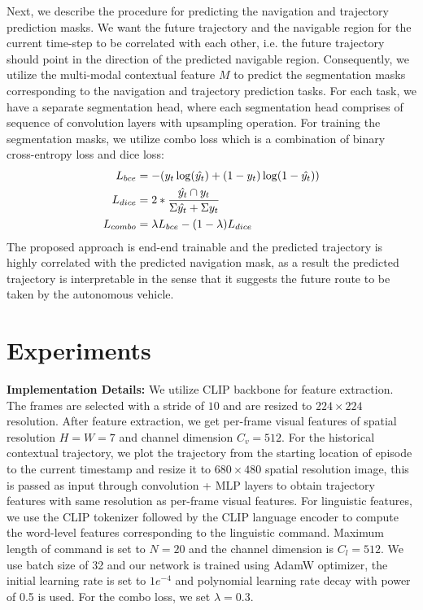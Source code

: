 \documentclass[11pt]{article}
\begin{document}
Next, we describe the procedure for predicting the navigation and trajectory prediction masks. We want the future trajectory and the navigable region for the current time-step to be correlated with each other, i.e. the future trajectory should point in the direction of the predicted navigable region. Consequently, we utilize the multi-modal contextual feature $M$ to predict the segmentation masks corresponding to the navigation and trajectory prediction tasks. For each task, we have a separate segmentation head, where each segmentation head comprises of sequence of convolution layers with upsampling operation. For training the segmentation masks, we utilize combo loss \cite{taghanaki2019combo} which is a combination of binary cross-entropy loss and dice loss:
\begin{equation} \label{eq2}
\begin{split}
    L_{bce} &= -{(y_{t}\log(\hat{y_{t}}) + (1 - y_{t})\log(1 - \hat{y_{t}}))}\\
    L_{dice} &= 2 * \frac{\hat{y_{t}} \cap y_{t}}{\Sigma{\hat{y_{t}}} + \Sigma{y_{t}}}\\        L_{combo} &= \lambda L_{bce} - (1 - \lambda) L_{dice}
\end{split}
\raisetag{3\normalbaselineskip}
\end{equation}
The proposed approach is end-end trainable and the predicted trajectory is highly correlated with the predicted navigation mask, as a result the predicted trajectory is interpretable in the sense that it suggests the future route to be taken by the autonomous vehicle.

\section{Experiments}

\textbf{Implementation Details: }We utilize CLIP backbone \cite{Radford2021LearningTV} for feature extraction. The frames are selected with a stride of $10$ and are resized to $224 \times 224$ resolution. After feature extraction, we get per-frame visual features of spatial resolution $H=W=7$ and channel dimension $C_v=512$. For the historical contextual trajectory, we plot the trajectory from the starting location of episode to the current timestamp and resize it to $680 \times 480$ spatial resolution image, this is passed as input through convolution + MLP layers to obtain trajectory features with same resolution as per-frame visual features. For linguistic features, we use the CLIP tokenizer followed by the CLIP language encoder to compute the word-level features corresponding to the linguistic command. Maximum length of command is set to $N=20$ and the channel dimension is $C_l=512$. We use batch size of 32 and our network is trained using AdamW optimizer, the initial learning rate is set to $1e^{-4}$ and polynomial learning rate decay with power of 0.5 is used. For the combo loss, we set $\lambda = 0.3$.
\end{document}
